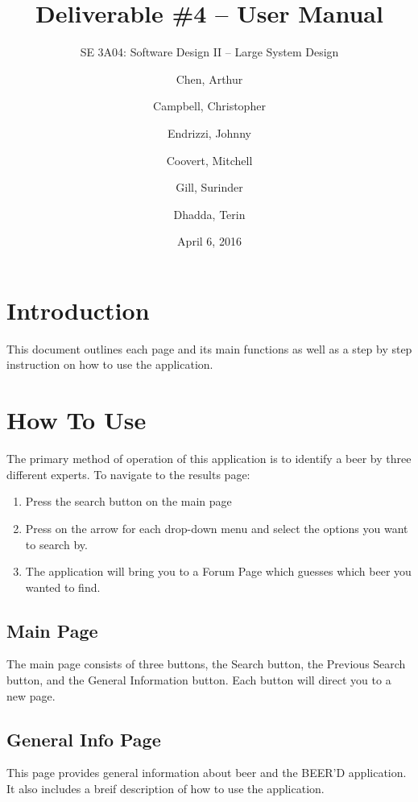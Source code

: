 \documentclass[]{article}
\title{Deliverable \#4 -- User Manual}
\author{SE 3A04: Software Design II -- Large System Design}
\author{Chen, Arthur \and Campbell, Christopher \and Endrizzi, Johnny \\ 
\and Coovert, Mitchell \and Gill, Surinder \and Dhadda, Terin}
\date {April 6, 2016}
\begin{document}
\maketitle	
\newpage
\tableofcontents
\listoffigures
\listoftables
\newpage

\section{Introduction}
\label{sec:introduction}
This document outlines each page and its main functions as well as a step by step instruction on how to use the application.

\section{How To Use}
The primary method of operation of this application is to identify a beer by three different experts. To navigate to the results page:
\begin{enumerate}
\item Press the search button on the main page
\item Press on the arrow for each drop-down menu and select the options you want to search by.
\item The application will bring you to a Forum Page which guesses which beer you wanted to find.

\end{enumerate}

\subsection{Main Page}
\label{sec:main_page}
The main page consists of three buttons, the Search button, the Previous Search button, and the General Information button.
Each button will direct you to a new page.

\subsection{General Info Page}
\label{sec:general_info_page}
This page provides general information about beer and the BEER'D application. It also includes a breif description of how to use the application.
\end{document}
